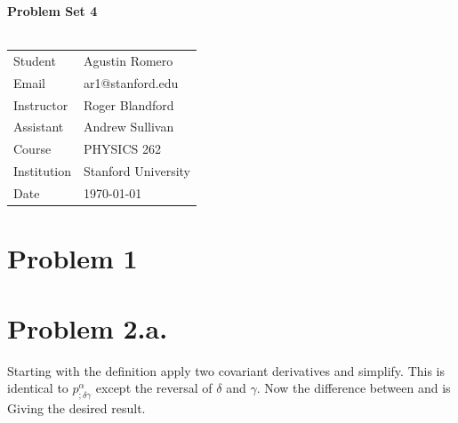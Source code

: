 \documentclass{article}
\begin{document}
\begin{center}
\textbf{\Large{Problem Set 4}}\\~\\
\begin{tabular}{l l}
Student&Agustin Romero\\
Email&ar1@stanford.edu\\
Instructor&Roger Blandford\\
Assistant&Andrew Sullivan\\
Course&PHYSICS 262\\
Institution&Stanford University\\
Date&\today\\
\end{tabular}
\end{center}
\section*{Problem 1}
\section*{Problem 2.a.}
Starting with the definition
apply two covariant derivatives and simplify.
This is identical to $p^{\alpha}_{;\delta \gamma}$ except the reversal of $\delta$ and $\gamma$.
Now the difference between  and  is
Giving the desired result.
\end{document}
